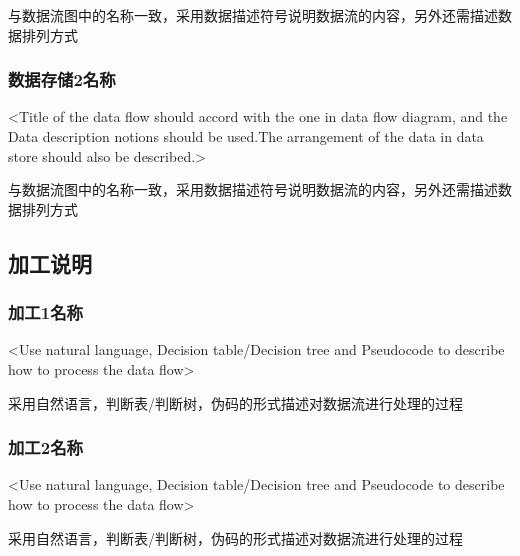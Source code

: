 与数据流图中的名称一致，采用数据描述符号说明数据流的内容，另外还需描述数据排列方式

\subsubsection{数据存储2名称}
<Title of  the data flow should accord with the one in data flow diagram, and the Data description notions should be used.The arrangement of the data in data store should also be described.>

与数据流图中的名称一致，采用数据描述符号说明数据流的内容，另外还需描述数据排列方式

\subsection{加工说明}
\subsubsection{加工1名称}
<Use natural language, Decision table/Decision tree and Pseudocode to describe how to process the data flow>

采用自然语言，判断表/判断树，伪码的形式描述对数据流进行处理的过程

\subsubsection{加工2名称}
<Use natural language, Decision table/Decision tree and Pseudocode to describe how to process the data flow>

采用自然语言，判断表/判断树，伪码的形式描述对数据流进行处理的过程

